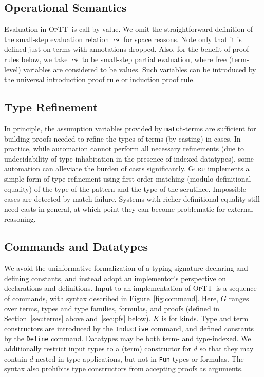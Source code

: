 \documentclass[preprint,natbib]{sigplanconf}
\newcommand{\optt}{\textsc{OpTT}}
\begin{document}
\subsection{Operational Semantics}
\label{sec:opsem}

Evaluation in \optt\ is call-by-value.  We omit the straightforward
definition of the small-step evaluation relation $\leadsto$ for space
reasons.  Note only that it is defined just on terms with annotations
dropped.  Also, for the benefit of proof rules below, we take
$\leadsto$ to be small-step partial evaluation, where free
(term-level) variables are considered to be values.  Such variables
can be introduced by the universal introduction proof rule or
induction proof rule.

\subsection{Type Refinement}

In principle, the assumption variables provided by
\texttt{match}-terms are sufficient for building proofs needed to
refine the types of terms (by casting) in cases.  In practice, while
automation cannot perform all necessary refinements (due to
undecidability of type inhabitation in the presence of indexed
datatypes), some automation can alleviate the burden of casts
significantly.  \textsc{Guru} implements a simple form of type
refinement using first-order matching (modulo definitional equality)
of the type of the pattern and the type of the scrutinee.  Impossible
cases are detected by match failure.  Systems with richer definitional
equality still need casts in general, at which point they can become
problematic for external reasoning.

\subsection{Commands and Datatypes}
\label{sec:commands}

We avoid the uninformative formalization of a typing signature
declaring and defining constants, and instead adopt an implementor's
perspective on declarations and definitions.  Input to an
implementation of \optt\ is a sequence of commands, with syntax
described in Figure~\ref{fig:command}.  Here, $G$ ranges over terms,
types and type families, formulas, and proofs (defined in
Section~\ref{sec:terms} above and~\ref{sec:pfs} below).  $K$ is for
kinds.  Type and term constructors are introduced by the
\texttt{Inductive} command, and defined constants by the
\texttt{Define} command.  Datatypes may be both term- and
type-indexed.  We additionally restrict input types to a (term)
constructor for $d$ so that they may contain $d$ nested in type
applications, but not in \texttt{Fun}-types or formulas.  The syntax
also prohibits type constructors from accepting proofs as arguments.
\end{document}

